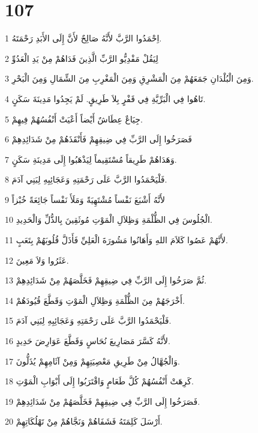\chapter{107}

\par 1 اِحْمَدُوا الرَّبَّ لأَنَّهُ صَالِحٌ لأَنَّ إِلَى الأَبَدِ رَحْمَتَهُ.
\par 2 لِيَقُلْ مَفْدِيُّو الرَّبِّ الَّذِينَ فَدَاهُمْ مِنْ يَدِ الْعَدُوِّ
\par 3 وَمِنَ الْبُلْدَانِ جَمَعَهُمْ مِنَ الْمَشْرِقِ وَمِنَ الْمَغْرِبِ مِنَ الشِّمَالِ وَمِنَ الْبَحْرِ.
\par 4 تَاهُوا فِي الْبَرِّيَّةِ فِي قَفْرٍ بِلاَ طَرِيقٍ. لَمْ يَجِدُوا مَدِينَةَ سَكَنٍ.
\par 5 جِيَاعٌ عِطَاشٌ أَيْضاً أَعْيَتْ أَنْفُسُهُمْ فِيهِمْ.
\par 6 فَصَرَخُوا إِلَى الرَّبِّ فِي ضِيقِهِمْ فَأَنْقَذَهُمْ مِنْ شَدَائِدِهِمْ
\par 7 وَهَدَاهُمْ طَرِيقاً مُسْتَقِيماً لِيَذْهَبُوا إِلَى مَدِينَةِ سَكَنٍ.
\par 8 فَلْيَحْمَدُوا الرَّبَّ عَلَى رَحْمَتِهِ وَعَجَائِبِهِ لِبَنِي آدَمَ.
\par 9 لأَنَّهُ أَشْبَعَ نَفْساً مُشْتَهِيَةً وَمَلَأَ نَفْساً جَائِعَةً خُبْزاً
\par 10 الْجُلُوسَ فِي الظُّلْمَةِ وَظِلاَلِ الْمَوْتِ مُوثَقِينَ بِالذُّلِّ وَالْحَدِيدِ.
\par 11 لأَنَّهُمْ عَصُوا كَلاَمَ اللهِ وَأَهَانُوا مَشُورَةَ الْعَلِيِّ فَأَذَلَّ قُلُوبَهُمْ بِتَعَبٍ.
\par 12 عَثَرُوا وَلاَ مَعِينَ.
\par 13 ثُمَّ صَرَخُوا إِلَى الرَّبِّ فِي ضِيقِهِمْ فَخَلَّصَهُمْ مِنْ شَدَائِدِهِمْ.
\par 14 أَخْرَجَهُمْ مِنَ الظُّلْمَةِ وَظِلاَلِ الْمَوْتِ وَقَطَّعَ قُيُودَهُمْ.
\par 15 فَلْيَحْمَدُوا الرَّبَّ عَلَى رَحْمَتِهِ وَعَجَائِبِهِ لِبَنِي آدَمَ.
\par 16 لأَنَّهُ كَسَّرَ مَصَارِيعَ نُحَاسٍ وَقَطَّعَ عَوَارِضَ حَدِيدٍ.
\par 17 وَالْجُهَّالُ مِنْ طَرِيقِ مَعْصِيَتِهِمْ وَمِنْ آثَامِهِمْ يُذَلُّونَ.
\par 18 كَرِهَتْ أَنْفُسُهُمْ كُلَّ طَعَامٍ وَاقْتَرَبُوا إِلَى أَبْوَابِ الْمَوْتِ.
\par 19 فَصَرَخُوا إِلَى الرَّبِّ فِي ضِيقِهِمْ فَخَلَّصَهُمْ مِنْ شَدَائِدِهِمْ.
\par 20 أَرْسَلَ كَلِمَتَهُ فَشَفَاهُمْ وَنَجَّاهُمْ مِنْ تَهْلُكَاتِهِمْ.
